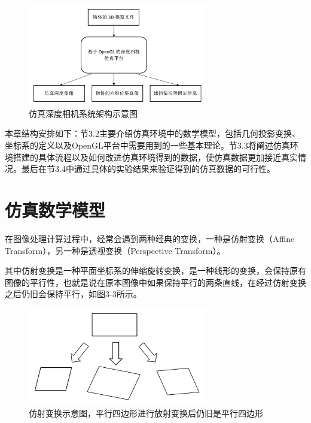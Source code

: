 \begin{figure}[htb]
	\centering 
	\includegraphics[width=0.7\textwidth]{./mypic/仿真深度相机系统结构.jpg} 
	\caption{仿真深度相机系统架构示意图} 
\end{figure}

本章结构安排如下：节3.2主要介绍仿真环境中的数学模型，包括几何投影变换、坐标系的定义以及OpenGL平台中需要用到的一些基本理论。节3.3将阐述仿真环境搭建的具体流程以及如何改进仿真环境得到的数据，使仿真数据更加接近真实情况。最后在节3.4中通过具体的实验结果来验证得到的仿真数据的可行性。


\section{仿真数学模型}
在图像处理计算过程中，经常会遇到两种经典的变换，一种是仿射变换（Affine Transform），另一种是透视变换（Perspective Transform）。

其中仿射变换是一种平面坐标系的伸缩旋转变换，是一种线形的变换，会保持原有图像的平行性，也就是说在原本图像中如果保持平行的两条直线，在经过仿射变换之后仍旧会保持平行，如图3-3所示。

\begin{figure}[htb]
	\centering 
	\includegraphics[width=0.7\textwidth]{./mypic/仿射变换示意图.jpg} 
	\caption{仿射变换示意图，平行四边形进行放射变换后仍旧是平行四边形} 
\end{figure}


